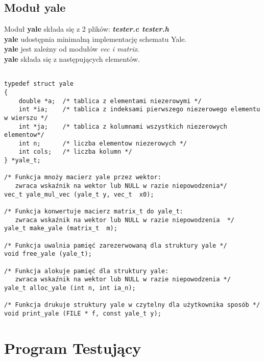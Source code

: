 \documentclass[bibtotocnumbered, headsepline,normalheadings,12pt,polish]{scrreprt}
\begin{document}
\subsection{Moduł yale}
\normalsize
Moduł \textbf{yale} składa się z 2 plików: \textit{\textbf{tester.c tester.h}}\\
\textbf{yale} udostępnia minimalną implementację schematu Yale.\\
\textbf{yale} jest zależny od \large{modułów \emph{vec i matrix}}.\normalsize\\

\textbf{yale} składa się z następujących elementów.
\small
\begin{verbatim}

typedef struct yale
{
    double *a;  /* tablica z elementami niezerowymi */
    int *ia;    /* tablica z indeksami pierwszego niezerowego elementu w wierszu */
    int *ja;    /* tablica z kolumnami wszystkich niezerowych elementow*/
    int n;      /* liczba elementow niezerowych */
    int cols;   /* liczba kolumn */
} *yale_t;

/* Funkcja mnoży macierz yale przez wektor: 
   zwraca wskaźnik na wektor lub NULL w razie niepowodzenia*/
vec_t yale_mul_vec (yale_t y, vec_t  x0);

/* Funkcja konwertuje macierz matrix_t do yale_t: 
   zwraca wskaźnik na wektor lub NULL w razie niepowodzenia  */
yale_t make_yale (matrix_t  m);

/* Funkcja uwalnia pamięć zarezerwowaną dla struktury yale */
void free_yale (yale_t);

/* Funkcja alokuje pamięć dla struktury yale:
   zwraca wskaźnik na wektor lub NULL w razie niepowodzenia */ 
yale_t alloc_yale (int n, int ia_n);

/* Funkcja drukuje struktury yale w czytelny dla użytkownika sposób */
void print_yale (FILE * f, const yale_t y);

\end{verbatim}



\pagebreak

\section{Program Testujący}
\end{document}
